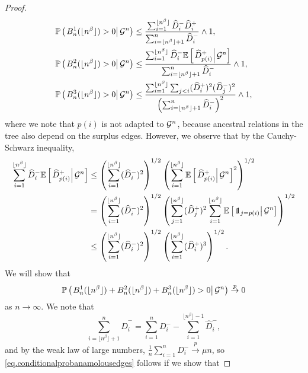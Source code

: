 \begin{proof}
\begin{align*}{\mathbb P}\left(\left.B^1_n(\lfloor n^\beta \rfloor)>0\right| {\mathcal G}^n \right)&\leq \frac{\sum_{i=1}^{\lfloor n^\beta \rfloor} \widehat{D}^-_i\widehat{D}^+_i}{\sum_{i=\lfloor n^\beta \rfloor+1}^n \widehat{D}^-_i}\wedge 1,\\
{\mathbb P}\left(\left.B^2_n(\lfloor n^\beta \rfloor)>0\right| {\mathcal G}^n \right)&\leq \frac{\sum_{i=1}^{\lfloor n^\beta \rfloor} \widehat{D}^-_i{\mathbb E}\left[\left.\widehat{D}^+_{p(i)}\right|{\mathcal G}^n\right]}{\sum_{i=\lfloor n^\beta \rfloor+1}^n \widehat{D}^-_i}\wedge 1,\\
{\mathbb P}\left(\left.B^3_n(\lfloor n^\beta \rfloor)>0\right| {\mathcal G}^n \right)&\leq \frac{\sum_{i=1}^{\lfloor n^\beta \rfloor}\sum_{j<i} (\widehat{D}^+_i)^2 (\widehat{D}^-_j)^2 }{\left(\sum_{i=\lfloor n^\beta \rfloor+1}^n \widehat{D}^-_i\right)^2 }\wedge 1,\end{align*}
where we note that $p(i)$ is not adapted to ${\mathcal G}^n$, because ancestral relations in the tree also depend on the surplus edges. However, we observe that by the Cauchy-Schwarz inequality,
\begin{align*}\sum_{i=1}^{\lfloor n^\beta \rfloor} \widehat{D}^-_i\E\left[\left.\widehat{D}^+_{p(i)}\right|\cG^n\right]&\leq \left(\sum_{i=1}^{\lfloor n^\beta \rfloor} (\widehat{D}^-_i)^2\right)^{1/2}\left(\sum_{i=1}^{\lfloor n^\beta \rfloor} \E\left[\left.\widehat{D}^+_{p(i)}\right|\cG^n\right]^2\right)^{1/2}\\
&= \left(\sum_{i=1}^{\lfloor n^\beta \rfloor} (\widehat{D}^-_i)^2\right)^{1/2}\left(\sum_{j=1}^{\lfloor n^\beta \rfloor} (\widehat{D}^+_{j})^2\sum_{i=1}^{\lfloor n^\beta \rfloor}\E\left[\left.\one_{j=p(i)}\right| \cG^n\right]\right)^{1/2}\\ 
&\leq\left(\sum_{i=1}^{\lfloor n^\beta \rfloor} (\widehat{D}^-_i)^2\right)^{1/2}\left(\sum_{i=1}^{\lfloor n^\beta \rfloor} (\widehat{D}^+_i)^3\right)^{1/2}.\end{align*}
We will show that \begin{equation}\label{eq.conditionalprobanamolousedges}{\mathbb P}\left(\left.B^1_n(\lfloor n^\beta \rfloor)+B^2_n(\lfloor n^\beta \rfloor)+B^3_n(\lfloor n^\beta \rfloor)>0\right| {\mathcal G}^n \right)\overset{p}{\to}0\end{equation} as $n\to\infty$. We note that 
$$\sum_{i=\lfloor n^\beta \rfloor+1}^n \widehat{D}^-_i=\sum_{i=1}^n D^-_i-\sum_{i=1}^{\lfloor n^\beta \rfloor -1}\widehat{D}^-_i,$$
and by the weak law of large numbers, $\frac{1}{n}\sum_{i=1}^n D^-_i\overset{p}{\to} \mu n$, so \cref{eq.conditionalprobanamolousedges} follows if we show that 

\end{proof}
